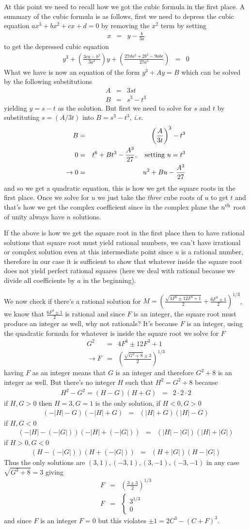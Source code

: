 \documentclass[aps,preprint,preprintnumbers,nofootinbib,showpacs,prd]{revtex4-1}
\newcommand{\ie}{{\it i.e.} }
\newcommand{\ba}{\begin{array}}
\newcommand{\ea}{\end{array}}
\newcommand{\nbea}{\begin{eqnarray*}}
\newcommand{\neea}{\end{eqnarray*}}
\begin{document}
At this point we need to recall how we got the cubic formula in the first place. A summary of the cubic formula is as follows, first we need to depress the cubic equation $ax^3 + bx^2 + cx + d = 0$ by removing the $x^2$ term by setting
%
\nbea
x & = & y - \frac{b}{3a}
\neea
%
to get the depressed cubic equation
%
\nbea
y^3 + \left ( \frac{3ca - b^2}{3a^2} \right )y + \left ( \frac{27da^2 + 2b^3 - 9abc}{27a^3} \right ) & = & 0
\neea
%
What we have is now an equation of the form $y^3 + Ay = B$ which can be solved by the following substitutions
%
\nbea
A & = & 3st \\
B & = & s^3 - t^3
\neea
%
yielding $y = s-t$ as the solution. But first we need to solve for $s$ and $t$ by substituting $s = (A/3t)$ into $B = s^3 - t^3$, \ie
%
\nbea
B & = & \left ( \frac{A}{3t} \right )^3 - t^3 \\
0 & = & t^6 + Bt^3 - \frac{A^3}{27}, ~~~ {\rm setting~}u = t^3 \\
\to 0 & = & u^2 + Bu - \frac{A^3}{27}
\neea
%
and so we get a quadratic equation, this is how we get the square roots in the first place. Once we solve for $u$ we just take the {\it three} cube roots of $u$ to get $t$ and that's how we get the complex coefficient since in the complex plane the $n^{\rm th}$ root of unity always have $n$ solutions.

If the above is how we get the square root in the first place then to have rational solutions that square root must yield rational numbers, we can't have irrational or complex solution even at this intermediate point since $u$ is a rational number, therefore in our case it is sufficient to show that whatever inside the square root does not yield perfect rational squares (here we deal with rational because we divide all coefficients by $a$ in the beginning).

We now check if there's a rational solution for $M = \left (\frac{\sqrt{4F^6\pm12F^3+1}}{2}+\frac{6F^3\pm1}{2} \right )^{1/3}$, we know that $\frac{6F^3\pm1}{2}$ is rational and since $F$ is an integer, the square root must produce an integer as well, why not rationals? It's because $F$ is an integer, using the quadratic formula for whatever is inside the square root we solve for $F$
%
\nbea
G^2 & = & 4F^6\pm12F^3+1 \\
\to F & = & \left ( \frac{ \sqrt{G^2 + 8} \pm 3 }{2} \right )^{1/3}
\neea
%
having $F$ as an integer means that $G$ is an integer and therefore $G^2 + 8$ is an integer as well. But there's no integer $H$ such that $H^2 = G^2 + 8$ because
%
\nbea
H^2 - G^2 = (H - G)(H + G) & = & 2 \cdot 2 \cdot 2
\neea
%
if $H,G > 0$ then $H = 3, G=1$ is the only solution, if $H < 0, G > 0$ 
%
\nbea
(-|H| - G)(-|H| + G) & = & (|H| + G)(|H|-G)
\neea
%
if $H,G < 0$ 
%
\nbea
(-|H| - (-|G|))(-|H| + (-|G|)) & = & (|H| - |G|)(|H| + |G|)
\neea
%
if $H > 0, G < 0$ 
%
\nbea
(H - (-|G|))(H + (-|G|)) & = & (H + |G|)(H - |G|)
\neea
%
Thus the only solutions are $(3,1), (-3,1), (3,-1), (-3,-1)$ in any case $\sqrt{G^2 + 8} = 3$ giving
%
\nbea
F & = & \left ( \frac{ 3 \pm 3 }{2} \right )^{1/3} \\
F & = & \left \{ \ba{l}
3^{1/3} \\
0
\ea
\right.
\neea
%
and since $F$ is an integer $F=0$ but this violates $\pm 1 = 2C^3 - (C+F)^3$.
\end{document}
